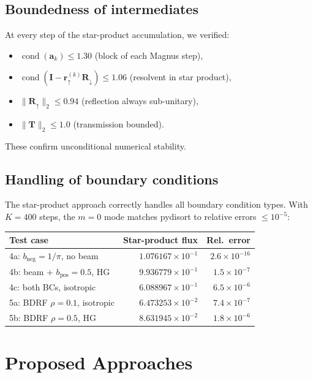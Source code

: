 \documentclass[11pt,a4paper]{article}
\newcommand{\cond}{\operatorname{cond}}
\newcommand{\mat}[1]{\mathbf{#1}}
\theoremstyle{definition}
\begin{document}
\subsection{Boundedness of intermediates}
At every step of the star-product accumulation, we verified:
\begin{itemize}[nosep]
\item $\cond(\mat{a}_k)\leq 1.30$ (block of each Magnus step),
\item $\cond(\mat{I}-\mat{r}_\uparrow^{(k)}\mat{R}_\downarrow)\leq 1.06$
  (resolvent in star product),
\item $\|\mat{R}_\uparrow\|_2 \leq 0.94$ (reflection always sub-unitary),
\item $\|\mat{T}\|_2 \leq 1.0$ (transmission bounded).
\end{itemize}
These confirm unconditional numerical stability.

\subsection{Handling of boundary conditions}
The star-product approach correctly handles all boundary condition types.
With $K=400$ steps, the $m=0$ mode matches pydisort to relative errors
$\leq 10^{-5}$:
\begin{center}
\begin{tabular}{lrr}
\toprule
Test case & Star-product flux & Rel.\ error \\
\midrule
4a: $b_{\text{neg}}=1/\pi$, no beam   & $1.076167\times 10^{-1}$ & $2.6\times 10^{-16}$ \\
4b: beam + $b_{\text{pos}}=0.5$, HG   & $9.936779\times 10^{-1}$ & $1.5\times 10^{-7}$  \\
4c: both BCs, isotropic                & $6.088967\times 10^{-1}$ & $6.5\times 10^{-6}$  \\
5a: BDRF $\rho=0.1$, isotropic         & $6.473253\times 10^{-2}$ & $7.4\times 10^{-7}$  \\
5b: BDRF $\rho=0.5$, HG               & $8.631945\times 10^{-2}$ & $1.8\times 10^{-6}$  \\
\bottomrule
\end{tabular}
\end{center}


\section{Proposed Approaches}\label{sec:proposals}
\end{document}
